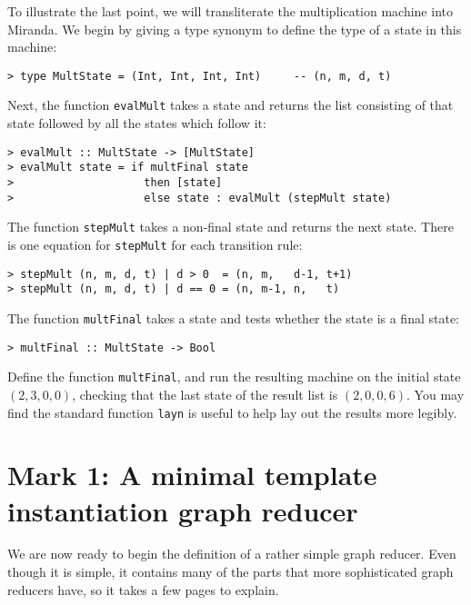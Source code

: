 To illustrate the last point, we will transliterate the multiplication
machine into Miranda.  We begin by giving a type synonym to define the
type of a state in this machine:
\begin{verbatim}
> type MultState = (Int, Int, Int, Int)     -- (n, m, d, t)
\end{verbatim}
%
Next, the function \mbox{\tt evalMult} takes a state and
returns the list consisting of that state followed by all
the states which follow it:
\begin{verbatim}
> evalMult :: MultState -> [MultState]
> evalMult state = if multFinal state 
>                    then [state]
>                    else state : evalMult (stepMult state)
\end{verbatim}
%
%
The function \mbox{\tt stepMult} takes a non-final state and returns the next state.
There is one equation for \mbox{\tt stepMult} for each transition rule:
\begin{verbatim}
> stepMult (n, m, d, t) | d > 0  = (n, m,   d-1, t+1)
> stepMult (n, m, d, t) | d == 0 = (n, m-1, n,   t)
\end{verbatim}
%
%
The function \mbox{\tt multFinal} takes a state and
tests whether the state is a final state:
\begin{verbatim}
> multFinal :: MultState -> Bool
\end{verbatim}
%
\begin{exercise}
Define the function \mbox{\tt multFinal}, and run the resulting machine on
the initial state $(2,3,0,0)$, checking that the last state of the result
list is $(2,0,0,6)$.  You may find the standard function \mbox{\tt layn} is useful
to help lay out the results more legibly.
\end{exercise}

\section{Mark 1: A minimal template instantiation graph reducer}

We are now ready to begin the definition of a rather simple graph reducer.
Even though it is simple, it contains many of the parts
that more sophisticated graph reducers have, so it takes a few pages
to explain.

